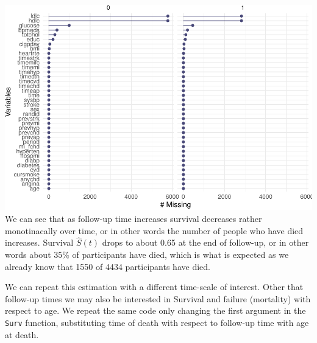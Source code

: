 \documentclass[
]{book}
\newenvironment{Shaded}{\begin{snugshade}}{\end{snugshade}}
\newcommand{\DataTypeTok}[1]{\textcolor[rgb]{0.13,0.29,0.53}{#1}}
\newcommand{\DecValTok}[1]{\textcolor[rgb]{0.00,0.00,0.81}{#1}}
\newcommand{\KeywordTok}[1]{\textcolor[rgb]{0.13,0.29,0.53}{\textbf{#1}}}
\newcommand{\NormalTok}[1]{#1}
\newcommand{\OperatorTok}[1]{\textcolor[rgb]{0.81,0.36,0.00}{\textbf{#1}}}
\newcommand{\StringTok}[1]{\textcolor[rgb]{0.31,0.60,0.02}{#1}}
\begin{document}
\begin{Shaded}
\end{Shaded}

\includegraphics{adv_epi_analysis_files/figure-latex/unnamed-chunk-176-1.pdf}
We can see that as follow-up time increases survival decreases rather monotinacally over time, or in other words the number of people who have died increases. Survival \(\hat{S}(t)\) drops to about 0.65 at the end of follow-up, or in other words about 35\% of participants have died, which is what is expected as we already know that 1550 of 4434 participants have died.

We can repeat this estimation with a different time-scale of interest. Other that follow-up times we may also be interested in Survival and failure (mortality) with respect to age. We repeat the same code only changing the first argument in the \texttt{Surv} function, substituting time of death with respect to follow-up time with age at death.

\begin{Shaded}
\end{Shaded}
\end{document}
